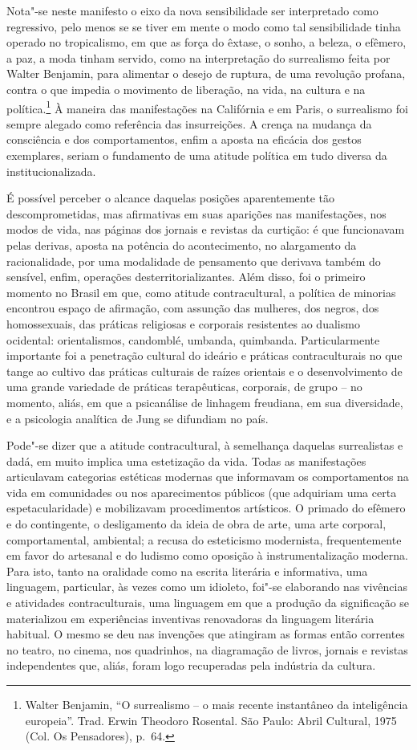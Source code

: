 Nota"-se neste manifesto o eixo da nova sensibilidade ser interpretado
como regressivo, pelo menos se se tiver em mente o modo como tal
sensibilidade tinha operado no tropicalismo, em que as força do êxtase,
o sonho, a beleza, o efêmero, a paz, a moda tinham servido, como na
interpretação do surrealismo feita por Walter Benjamin, para alimentar o
desejo de ruptura, de uma revolução profana, contra o que impedia o
movimento de liberação, na vida, na cultura e na política.\footnote{Walter
  Benjamin, ``O surrealismo -- o mais recente instantâneo da
  inteligência europeia''. Trad. Erwin Theodoro Rosental. São Paulo:
  Abril Cultural, 1975 (Col. Os Pensadores), p.~64.} À maneira das
manifestações na Califórnia e em Paris, o surrealismo foi sempre alegado
como referência das insurreições. A crença na mudança da consciência e
dos comportamentos, enfim a aposta na eficácia dos gestos exemplares,
seriam o fundamento de uma atitude política em tudo diversa da
institucionalizada.

É possível perceber o alcance daquelas posições aparentemente tão
descomprometidas, mas afirmativas em suas aparições nas manifestações,
nos modos de vida, nas páginas dos jornais e revistas da curtição: é que
funcionavam pelas derivas, aposta na potência do acontecimento, no
alargamento da racionalidade, por uma modalidade de pensamento que
derivava também do sensível, enfim, operações desterritorializantes.
Além disso, foi o primeiro momento no Brasil em que, como atitude
contracultural, a política de minorias encontrou espaço de afirmação,
com assunção das mulheres, dos negros, dos homossexuais, das práticas
religiosas e corporais resistentes ao dualismo ocidental: orientalismos,
candomblé, umbanda, quimbanda. Particularmente importante foi a
penetração cultural do ideário e práticas contraculturais no que tange
ao cultivo das práticas culturais de raízes orientais e o
desenvolvimento de uma grande variedade de práticas terapêuticas,
corporais, de grupo -- no momento, aliás, em que a psicanálise de
linhagem freudiana, em sua diversidade, e a psicologia analítica de Jung
se difundiam no país.

Pode"-se dizer que a atitude contracultural, à semelhança daquelas
surrealistas e dadá, em muito implica uma estetização da vida. Todas as
manifestações articulavam categorias estéticas modernas que informavam
os comportamentos na vida em comunidades ou nos aparecimentos públicos
(que adquiriam uma certa espetacularidade) e mobilizavam procedimentos
artísticos. O primado do efêmero e do contingente, o desligamento da
ideia de obra de arte, uma arte corporal, comportamental, ambiental; a
recusa do esteticismo modernista, frequentemente em favor do artesanal e
do ludismo como oposição à instrumentalização moderna. Para isto, tanto
na oralidade como na escrita literária e informativa, uma linguagem,
particular, às vezes como um idioleto, foi"-se elaborando nas vivências e
atividades contraculturais, uma linguagem em que a produção da
significação se materializou em experiências inventivas renovadoras da
linguagem literária habitual. O mesmo se deu nas invenções que atingiram
as formas então correntes no teatro, no cinema, nos quadrinhos, na
diagramação de livros, jornais e revistas independentes que, aliás,
foram logo recuperadas pela indústria da cultura.

